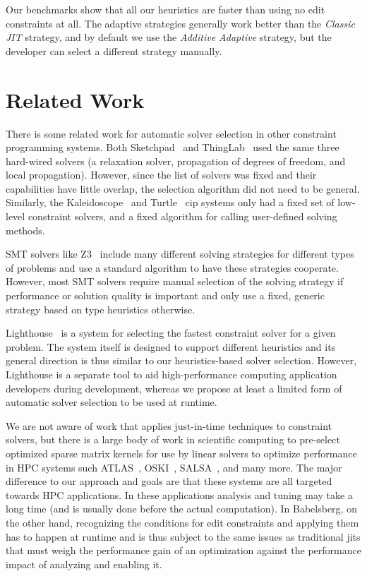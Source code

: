 \documentclass[numbers]{sigplanconf}
\newcommand{\ac}[1]{\gls{#1}}
\begin{document}
Our benchmarks show that all our heuristics are faster than using no edit
constraints at all. The adaptive strategies generally work better than the
\emph{Classic JIT} strategy, and by default we use the \emph{Additive Adaptive}
strategy, but the developer can select a different strategy manually.

\section{Related Work}
\label{sec:related-work}

There is some related work for automatic solver selection in other constraint
programming systems. Both Sketchpad~\cite{sutherland-ifips-1963} and
ThingLab~\cite{borning-toplas-1981} used the same three hard-wired solvers (a
relaxation solver, propagation of degrees of freedom, and local
propagation). However, since the list of solvers was fixed and their
capabilities have little overlap, the selection algorithm did not need to be
general. Similarly, the Kaleidoscope~\cite{lopez-oopsla-1994} and
Turtle~\cite{grabmuller2004turtle} \acrlong{cip} systems only had a fixed set of
low-level constraint solvers, and a fixed algorithm for calling user-defined
solving methods.

SMT solvers like Z3~\cite{de2008z3} include many different solving strategies
for different types of problems and use a standard algorithm to have these
strategies cooperate. However, most SMT solvers require manual selection of the
solving strategy if performance or solution quality is important and only use a
fixed, generic strategy based on type heuristics otherwise.

Lighthouse~\cite{SEPS15p66} is a system for selecting the fastest constraint
solver for a given problem. The system itself is designed to support different
heuristics and its general direction is thus similar to our heuristics-based
solver selection. However, Lighthouse is a separate tool to aid high-performance
computing application developers during development, whereas we propose at least
a limited form of automatic solver selection to be used at runtime.

We are not aware of work that applies just-in-time techniques to constraint
solvers, but there is a large body of work in scientific computing to pre-select
optimized sparse matrix kernels for use by linear solvers to optimize
performance in HPC systems such ATLAS~\cite{whaley2001automated},
OSKI~\cite{vuduc2005oski}, SALSA~\cite{demmel2005self}, and many more. The major
difference to our approach and goals are that these systems are all targeted
towards HPC applications. In these applications analysis and tuning may take a
long time (and is usually done before the actual computation). In Babelsberg, on
the other hand, recognizing the conditions for edit constraints and applying
them has to happen at runtime and is thus subject to the same issues as
traditional \ac{jit}s that must weigh the performance gain of an optimization
against the performance impact of analyzing and enabling it.
\end{document}

